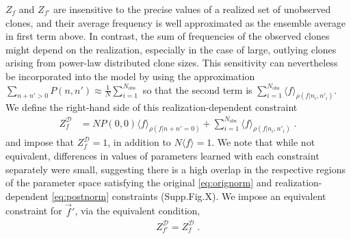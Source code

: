 \documentclass[letterpaper,english,prl,reprint,longbibliography]{revtex4-1} %
\begin{document}
$Z_f$ and $Z_{f'}$ are insensitive to the precise values of a realized set of unobserved clones, and their average frequency is well approximated as the ensemble average in first term above. In contrast, the sum of frequencies of the observed clones might depend on the realization, especially in the case of large, outlying clones arising from power-law distributed clone sizes. This sensitivity can nevertheless be incorporated into the model by using the approximation $\sum_{n+n'>0}P(n,n')\approx \frac{1}{N}\sum_{i=1}^{N_\textrm{obs}}$ so that the second term is $\sum_{i=1}^{N_{\textrm{obs}}}\langle f\rangle_{\rho(f|n_i,n'_i)}$. We define the right-hand side of this realization-dependent constraint 
\begin{align}
	Z^\mathcal{D}_f&= N	P(0,0)\langle f\rangle_{\rho(f|n+n'=0)} + \sum_{i=1}^{N_{\textrm{obs}}}\langle f\rangle_{\rho(f|n_i,n'_i)}\;.\label{eq:postnorm}
\end{align}
and impose that $Z^\mathcal{D}_f=1$, in addition to $N\langle f\rangle=1$. We note that while not equivalent, differences in values of parameters learned with each constraint separately were small, suggesting there is a high overlap in the respective regions of the parameter space satisfying the original  \ref{eq:orignorm} and realization-dependent \ref{eq:postnorm} constraints (Supp.Fig.X). We impose an equivalent constraint for $\vec{f}'$, via the equivalent condition, 
\begin{align}
	Z^\mathcal{D}_{f'}=Z^\mathcal{D}_f\;.\label{eq:fprimeconst}
\end{align}

\end{document}
